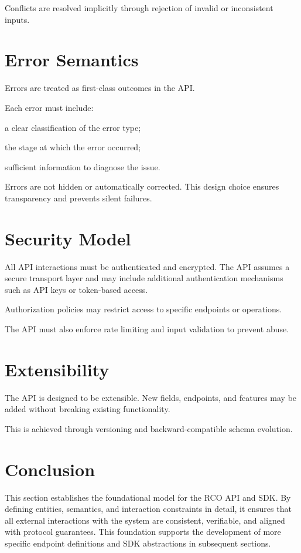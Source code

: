 Conflicts are resolved implicitly through rejection of invalid or inconsistent inputs.

\section{Error Semantics}

Errors are treated as first-class outcomes in the API.

Each error must include:

a clear classification of the error type;

the stage at which the error occurred;

sufficient information to diagnose the issue.

Errors are not hidden or automatically corrected. This design choice ensures transparency and prevents silent failures.

\section{Security Model}

All API interactions must be authenticated and encrypted. The API assumes a secure transport layer and may include additional authentication mechanisms such as API keys or token-based access.

Authorization policies may restrict access to specific endpoints or operations.

The API must also enforce rate limiting and input validation to prevent abuse.

\section{Extensibility}

The API is designed to be extensible. New fields, endpoints, and features may be added without breaking existing functionality.

This is achieved through versioning and backward-compatible schema evolution.

\section{Conclusion}

This section establishes the foundational model for the RCO API and SDK. By defining entities, semantics, and interaction constraints in detail, it ensures that all external interactions with the system are consistent, verifiable, and aligned with protocol guarantees. This foundation supports the development of more specific endpoint definitions and SDK abstractions in subsequent sections.

